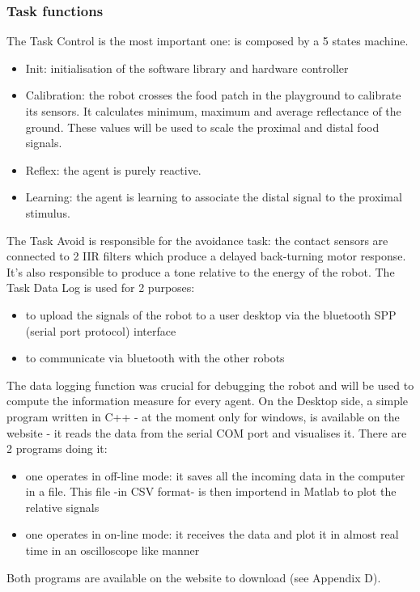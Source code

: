 \subsubsection{Task functions}
The Task Control is the most important one: is composed by a 5 states machine.
\begin{itemize}
 \item Init: initialisation of the software library and hardware controller
 \item Calibration: the robot crosses the food patch in the playground to calibrate its sensors.
       It calculates minimum, maximum and average reflectance of the ground.
       These values will be used to scale the proximal and distal food signals.
 \item Reflex: the agent is purely reactive.
 \item Learning: the agent is learning to associate the distal signal to the proximal stimulus.
\end{itemize}
The Task Avoid is responsible for the avoidance task: the contact sensors are connected
 to 2 IIR filters which produce a delayed back-turning motor response.
It's also responsible to produce a tone relative to the energy of the robot.
The Task Data Log is used for 2 purposes:
\begin{itemize}
 \item to upload the signals of the robot to a user desktop via the
bluetooth SPP (serial port protocol) interface
 \item to communicate via bluetooth with the other robots
\end{itemize}
The data logging function was crucial for debugging the robot and will be used to compute the information measure for every agent.
On the Desktop side, a simple program written in C++ - at the moment only for windows, is available on the website - it reads the data from the serial COM port and visualises it.
There are 2 programs doing it:
\begin{itemize}
 \item one operates in off-line mode: it saves all the incoming data in the computer in a file.
       This file -in CSV format- is then importend in Matlab to plot the relative signals
 \item one operates in on-line mode: it receives the data and plot it in almost real time in
       an oscilloscope like manner
\end{itemize}
Both programs are available on the website to download (see Appendix D).
